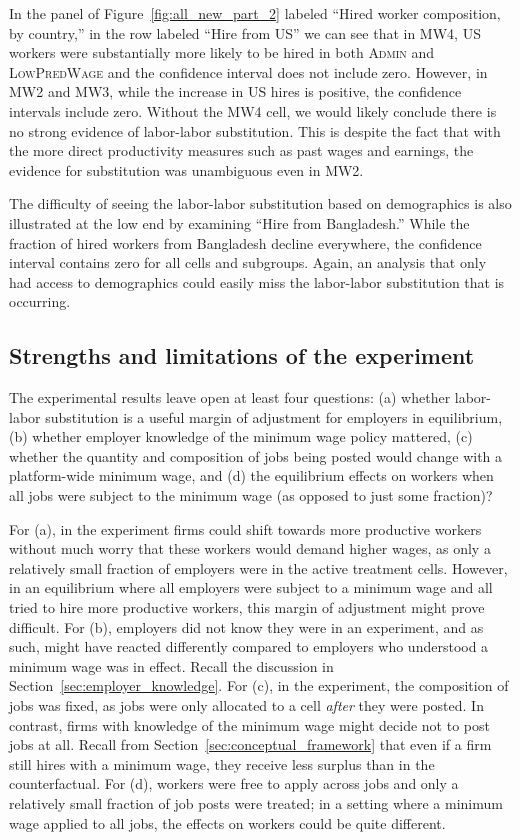 \documentclass[AER]{AEA}
\newcommand{\admin}{\textsc{Admin}}
\newcommand{\lpw}{\textsc{LowPredWage}}
\begin{document}
In the panel of Figure~\ref{fig:all_new_part_2} labeled ``Hired worker composition, by country,'' in the row labeled ``Hire from US'' we can see that in MW4, US workers were substantially more likely to be hired in both \admin{} and \lpw{} and the confidence interval does not include zero.
However, in MW2 and MW3, while the increase in US hires is positive, the confidence intervals include zero.
Without the MW4 cell, we would likely conclude there is no strong evidence of labor-labor substitution.
This is despite the fact that with the more direct productivity measures such as past wages and earnings, the evidence for substitution was unambiguous even in MW2.

The difficulty of seeing the labor-labor substitution based on demographics is also illustrated at the low end by examining ``Hire from Bangladesh.''
While the fraction of hired workers from Bangladesh decline everywhere, the confidence interval contains zero for all cells and subgroups.
Again, an analysis that only had access to demographics could easily miss the labor-labor substitution that is occurring. 

\subsection{Strengths and limitations of the experiment}

The experimental results leave open at least four questions:
(a) whether labor-labor substitution is a useful margin of adjustment for employers in equilibrium,
(b) whether employer knowledge of the minimum wage policy mattered,
(c) whether the quantity and composition of jobs being posted would change with a platform-wide minimum wage,
and (d) the equilibrium effects on workers when all jobs were subject to the minimum wage (as opposed to just some fraction)?


For (a), in the experiment firms could shift towards more productive workers without much worry that these workers would demand higher wages, as only a relatively small fraction of employers were in the active treatment cells.
However, in an equilibrium where all employers were subject to a minimum wage and all tried to hire more productive workers, this margin of adjustment might prove difficult. 
For (b), employers did not know they were in an experiment, and as such, might have reacted differently compared to employers who understood a minimum wage was in effect.
Recall the discussion in Section~\ref{sec:employer_knowledge}.
For (c), in the experiment, the composition of jobs was fixed, as jobs were only allocated to a cell \emph{after} they were posted.
In contrast, firms with knowledge of the minimum wage might decide not to post jobs at all.
Recall from Section~\ref{sec:conceptual_framework} that even if a firm still hires with a minimum wage, they receive less surplus than in the counterfactual.
For (d), workers were free to apply across jobs and only a relatively small fraction of job posts were treated; in a setting where a minimum wage applied to all jobs, the effects on workers could be quite different. 
\end{document}
